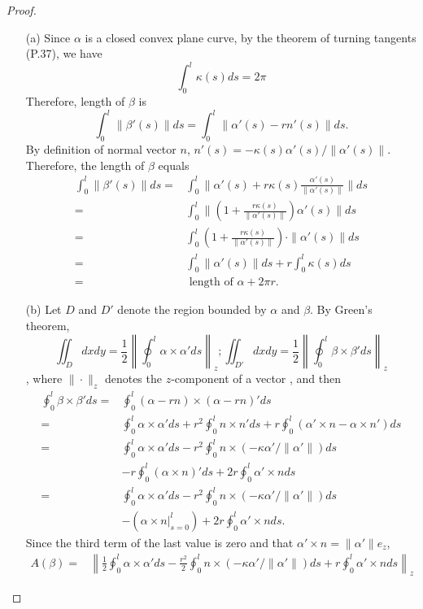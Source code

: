 \documentclass[12pt,a4paper]{article}
\begin{document}
\begin{proof}
\begin{enumerate}
\item[]
\item[(a)] Since $\alpha$ is a closed convex plane curve, by the theorem of turning tangents (P.37), we have \[ \int_0^l \kappa(s)ds = 2\pi \] Therefore, length of $\beta$ is 
\[\int_0^l \|\beta'(s)\| ds = \int_0^l \|\alpha'(s)-rn'(s)\|ds.\]
By definition of normal vector $n$, $n'(s)=-\kappa(s)\alpha'(s)/\|\alpha'(s)\|$. Therefore, the length of $\beta$ equals
\begin{align*}
\int_0^l \|\beta'(s)\| ds =& \int_0^l \|\alpha'(s)+r\kappa(s)\frac{\alpha'(s)}{\|\alpha'(s)\|}\| ds \\
 =& \int_0^l \|(1+\frac{r\kappa(s)}{\|\alpha'(s)\|})\alpha'(s)\| ds\\
 =& \int_0^l (1+\frac{r\kappa(s)}{\|\alpha'(s)\|})\cdot \|\alpha'(s)\| ds\\
 =& \int_0^l \|\alpha'(s)\| ds + r\int_0^l \kappa(s) ds\\
 =& \mbox{ length of $\alpha$} + 2\pi r.
\end{align*}
\item[(b)]
Let $D$ and $D'$ denote the region bounded by $\alpha$ and $\beta$. By Green's theorem, 
$$
\iint_D dxdy = \frac 12\left\|\oint_0^l \alpha\times\alpha' ds\right\|_z; \iint_{D'} dxdy = \frac 12\left\|\oint_0^l \beta\times\beta' ds\right\|_z
$$
, where $\|\cdot\|_z$ denotes the $z$-component of a vector , and then
\begin{align*}
\oint_0^l \beta\times\beta' ds =& \oint_0^l (\alpha - rn)\times(\alpha - rn)'ds
\\=& \oint_0^l \alpha\times\alpha' ds + r^2\oint_0^l n\times n' ds + r\oint_0^l (\alpha'\times n - \alpha\times n') ds
\\=& \oint_0^l \alpha\times\alpha' ds - r^2\oint_0^l n\times(-\kappa\alpha'/\|\alpha'\|) ds 
\\&- r\oint_0^l (\alpha\times n)'ds + 2r\oint_0^l\alpha'\times n ds
\\=& \oint_0^l \alpha\times\alpha' ds - r^2\oint_0^l n\times(-\kappa\alpha'/\|\alpha'\|) ds 
\\&- (\alpha\times n\vert_{s=0}^l) + 2r\oint_0^l\alpha'\times n ds.
\end{align*}
Since the third term of the last value is zero and that $\alpha'\times n = \|\alpha'\|e_z$, 
\begin{align*}
A(\beta) =& \left\|\frac 12\oint_0^l \alpha\times\alpha' ds - \frac{r^2}2\oint_0^l n\times(-\kappa\alpha'/\|\alpha'\|) ds + r\oint_0^l\alpha'\times n ds\right\|_z

\end{align*}
\end{enumerate}
\end{proof}
\end{document}
